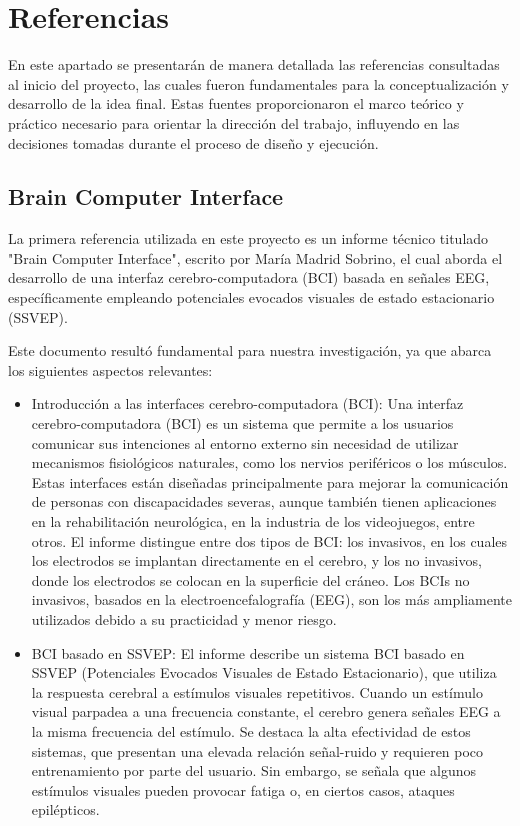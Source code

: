 \documentclass{article}
\begin{document}
\section{Referencias}
En este apartado se presentarán de manera detallada las referencias consultadas al inicio del proyecto, las cuales fueron fundamentales para la conceptualización y desarrollo de la idea final. Estas fuentes proporcionaron el marco teórico y práctico necesario para orientar la dirección del trabajo, influyendo en las decisiones tomadas durante el proceso de diseño y ejecución.

\subsection{Brain Computer Interface}

La primera referencia utilizada en este proyecto es un informe técnico titulado "Brain Computer Interface", escrito por María Madrid Sobrino, el cual aborda el desarrollo de una interfaz cerebro-computadora (BCI) basada en señales EEG, específicamente empleando potenciales evocados visuales de estado estacionario (SSVEP).

Este documento resultó fundamental para nuestra investigación, ya que abarca los siguientes aspectos relevantes:

\begin{itemize}
    \item Introducción a las interfaces cerebro-computadora (BCI): Una interfaz cerebro-computadora (BCI) es un sistema que permite a los usuarios comunicar sus intenciones al entorno externo sin necesidad de utilizar mecanismos fisiológicos naturales, como los nervios periféricos o los músculos. Estas interfaces están diseñadas principalmente para mejorar la comunicación de personas con discapacidades severas, aunque también tienen aplicaciones en la rehabilitación neurológica, en la industria de los videojuegos, entre otros.
    El informe distingue entre dos tipos de BCI: los invasivos, en los cuales los electrodos se implantan directamente en el cerebro, y los no invasivos, donde los electrodos se colocan en la superficie del cráneo. Los BCIs no invasivos, basados en la electroencefalografía (EEG), son los más ampliamente utilizados debido a su practicidad y menor riesgo.

    \item BCI basado en SSVEP: El informe describe un sistema BCI basado en SSVEP (Potenciales Evocados Visuales de Estado Estacionario), que utiliza la respuesta cerebral a estímulos visuales repetitivos. Cuando un estímulo visual parpadea a una frecuencia constante, el cerebro genera señales EEG a la misma frecuencia del estímulo.
    Se destaca la alta efectividad de estos sistemas, que presentan una elevada relación señal-ruido y requieren poco entrenamiento por parte del usuario. Sin embargo, se señala que algunos estímulos visuales pueden provocar fatiga o, en ciertos casos, ataques epilépticos.
\end{itemize}
\end{document}
